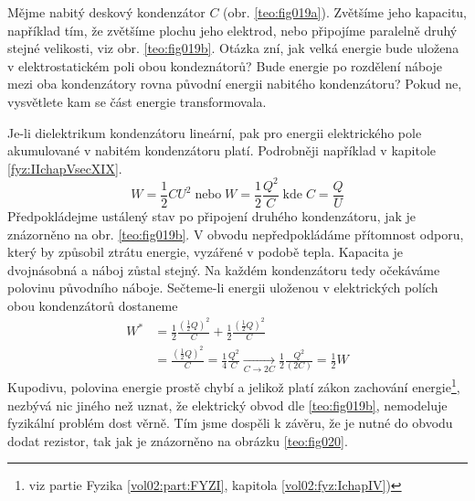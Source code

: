 \begin{mdframed}[style=mdexam]
  \begin{example}\label{teo:exam019}
    Mějme nabitý deskový kondenzátor \(C\) (obr. \ref{teo:fig019a}). Zvětšíme jeho kapacitu,
    například tím, že zvětšíme plochu jeho elektrod, nebo připojíme paralelně druhý stejné
    velikosti, viz obr. \ref{teo:fig019b}. Otázka zní, jak velká energie bude uložena v
    elektrostatickém poli obou kondeznátorů? Bude energie po rozdělení náboje mezi oba kondenzátory
    rovna původní energii nabitého kondenzátoru? Pokud ne, vysvětlete kam se část energie
    transformovala. 
    
    {\centering
      \captionsetup{type=figure}
      \hspace{1em}
      \hspace{1em}
      \label{teo:fig019}
    \par}
    
    Je-li dielektrikum kondenzátoru lineární, pak pro energii elektrického pole akumulované v
    nabitém kondenzátoru platí. Podrobněji například v kapitole \ref{fyz:IIchapVsecXIX}.
    \begin{equation}
      W = \frac{1}{2}CU^2 \;\text{nebo}\; W = \frac{1}{2}\frac{Q^2}{C} \;\text{kde}\; 
      C = \frac{Q}{U}
    \end{equation}
    Předpokládejme ustálený stav po připojení druhého kondenzátoru, jak je znázorněno na obr.
    \ref{teo:fig019b}. V obvodu nepředpokládáme přítomnost odporu, který by způsobil ztrátu energie,
    vyzářené v podobě tepla. Kapacita je dvojnásobná a náboj zůstal stejný. Na každém kondenzátoru
    tedy očekáváme polovinu původního náboje. Sečteme-li energii uloženou v elektrických polích obou
    kondenzátorů dostaneme
    \begin{align*}
      W^* &= \frac{1}{2}\frac{(\frac{1}{2}Q)^2}{C} + \frac{1}{2}\frac{(\frac{1}{2}Q)^2}{C}   \\
          &= \frac{(\frac{1}{2}Q)^2}{C} =\frac{1}{4}\frac{Q^2}{C}                 
           \xrightarrow[C\rightarrow2C]{}
            \frac{1}{2}\frac{Q^2}{(2C)} = \frac{1}{2}W 
    \end{align*}
    Kupodivu, polovina energie prostě chybí a jelikož platí zákon zachování energie\footnote{viz
    partie Fyzika \ref{vol02:part:FYZI}, kapitola \ref{vol02:fyz:IchapIV})}, nezbývá nic jiného než
    uznat, že elektrický obvod dle \ref{teo:fig019b}, nemodeluje fyzikální problém dost věrně. Tím
    jsme dospěli k závěru, že je nutné do obvodu dodat rezistor, tak jak je znázorněno na obrázku
    \ref{teo:fig020}.
    

\end{example}
\end{mdframed}

